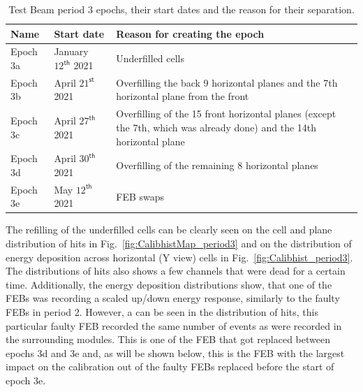 \begin{table}[!hbtp]
\centering
\caption[Description of Test Beam period 3 epochs]{Test Beam period 3 epochs, their start dates and the reason for their separation.}
\def\arraystretch{1.4}
\begin{tabular}{m{} m{} m{}}
Name & Start date & Reason for creating the epoch\\\hline
Epoch 3a & January $12^{\textsf{th}}$ 2021 & Underfilled cells\\
Epoch 3b & April $21^{\textsf{st}}$ 2021 & Overfilling the back 9 horizontal planes and the 7th horizontal plane from the front\\
Epoch 3c & April $27^{\textsf{th}}$ 2021 & Overfilling of the 15 front horizontal planes (except the 7th, which was already done) and the 14th horizontal plane\\
Epoch 3d & April $30^{\textsf{th}}$ 2021 & Overfilling of the remaining 8 horizontal planes\\
Epoch 3e & May $12^{\textsf{th}}$ 2021 & FEB swaps
\end{tabular}
\label{tab:TestBeamPeriod3Epochs}
\end{table}

The refilling of the underfilled cells can be clearly seen on the cell and plane distribution of hits in Fig.~\ref{fig:CalibhistMap_period3} and on the distribution of energy deposition across horizontal (Y view) cells in Fig.~\ref{fig:Calibhist_period3}. The distributions of hits also shows a few channels that were dead for a certain time.
Additionally, the energy deposition distributions show, that one of the \glspl{FEB} was recording a scaled up/down energy  response, similarly to the faulty \glspl{FEB} in period 2. However, a can be seen in the distribution of hits, this particular faulty \gls{FEB} recorded the same number of events as were recorded in the surrounding modules. This is one of the \gls{FEB} that got replaced between epochs 3d and 3e and, as will be shown below, this is the \gls{FEB} with the largest impact on the calibration out of the faulty \glspl{FEB} replaced before the start of epoch 3e.

